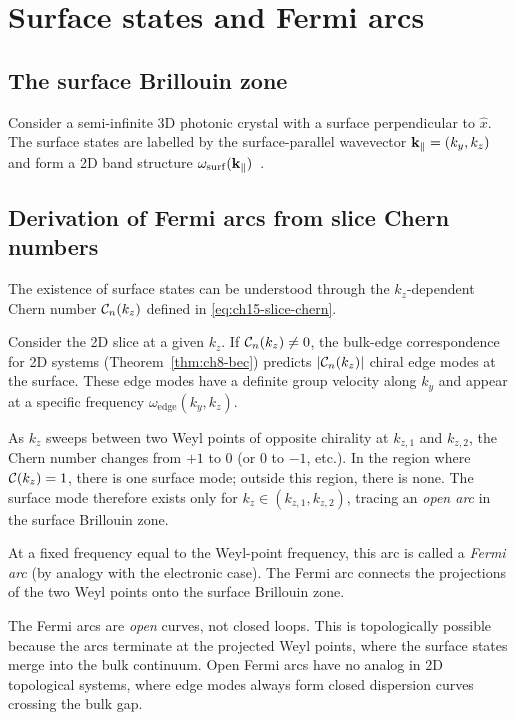 \section{Surface states and Fermi arcs}
\label{sec:ch15-surface}

\subsection{The surface Brillouin zone}
\label{sec:ch15-surface-bz}

Consider a semi-infinite 3D photonic crystal with a surface perpendicular
to $\hat{x}$.  The surface states are labelled by the surface-parallel
wavevector $\mathbf{k}_\parallel=(k_y,k_z)$ and form a 2D band structure
$\omega_{\mathrm{surf}}(\mathbf{k}_\parallel)$~\cite{kane2005sub}.

\subsection{Derivation of Fermi arcs from slice Chern numbers}
\label{sec:ch15-arcs-derivation}

The existence of surface states can be understood through the
$k_z$-dependent Chern number $\mathcal{C}_n(k_z)$ defined in
\eqref{eq:ch15-slice-chern}.

Consider the 2D slice at a given $k_z$.  If $\mathcal{C}_n(k_z)\neq 0$,
the bulk-edge correspondence for 2D systems
(Theorem~\ref{thm:ch8-bec}) predicts $|\mathcal{C}_n(k_z)|$ chiral edge modes
at the surface.  These edge modes have a definite group velocity along
$k_y$ and appear at a specific frequency $\omega_{\mathrm{edge}}(k_y,k_z)$.

As $k_z$ sweeps between two Weyl points of opposite chirality at
$k_{z,1}$ and $k_{z,2}$, the Chern number changes from $+1$ to $0$
(or $0$ to $-1$, etc.).  In the region where $\mathcal{C}(k_z)=1$, there is
one surface mode; outside this region, there is none.  The surface mode
therefore exists only for $k_z\in(k_{z,1},k_{z,2})$, tracing an
\emph{open arc} in the surface Brillouin zone.

At a fixed frequency equal to the Weyl-point frequency, this arc is
called a \emph{Fermi arc} (by analogy with the electronic case).  The
Fermi arc connects the projections of the two Weyl points onto the
surface Brillouin zone.

\begin{remark}
  The Fermi arcs are \emph{open} curves, not closed loops.  This is
  topologically possible because the arcs terminate at the projected
  Weyl points, where the surface states merge into the bulk continuum.
  Open Fermi arcs have no analog in 2D topological systems, where edge
  modes always form closed dispersion curves crossing the bulk gap.
\end{remark}

